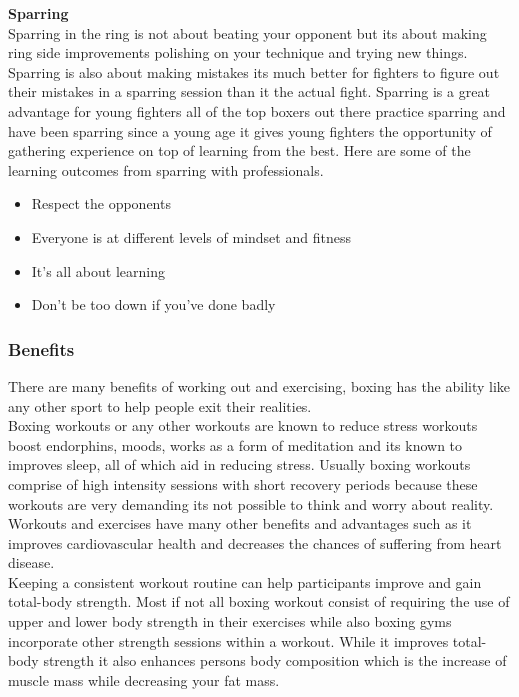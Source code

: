 \documentclass[a4paper,12pt,twoside]{report}
\begin{document}
\textbf{Sparring}\\
Sparring in the ring is not about beating your opponent but its about making ring side improvements polishing on your technique and trying new things. Sparring is also about making mistakes its much better for fighters to figure out their mistakes in a sparring session than it the actual fight.  
Sparring is a great advantage for young fighters all of the top boxers out there practice sparring and have been sparring since a young age it gives young fighters the opportunity of gathering experience on top of learning from the best. 
Here are some of the learning outcomes from sparring with professionals.\cite{sparringWorkout}
\begin{itemize}
    \item Respect the opponents
    \item Everyone is at different levels of mindset and fitness
    \item It’s all about learning
    \item Don’t be too down if you’ve done badly
\end{itemize}

\subsubsection{Benefits}
There are many benefits of working out and exercising, boxing has the ability like any other sport to help people exit their realities.\\
Boxing workouts or any other workouts are known to reduce stress workouts boost endorphins,  moods, works as a form of meditation and its known to improves sleep, all of which aid in reducing stress.
Usually boxing workouts comprise of high intensity sessions with short recovery periods because these workouts are very demanding its not possible to think and worry about reality.\\

Workouts and exercises have many other benefits and advantages such as it improves cardiovascular health and decreases the chances of suffering from heart disease.\\

Keeping a consistent workout routine can help participants improve and gain total-body strength. Most if not all boxing workout consist of requiring the use of upper and lower body strength in their exercises while also boxing gyms incorporate other strength sessions within a workout. While it improves total-body strength it also enhances persons body composition which is the increase of muscle mass while decreasing your fat mass.\cite{workoutBenifits}   
\newpage
\end{document}
